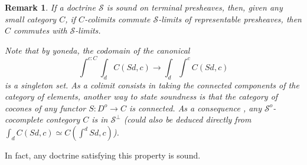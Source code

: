 \documentclass{article}
\newtheorem{question}[theorem]{Question}
\newtheorem{remark}[theorem]{Remark}
\begin{document}
\begin{remark}
 If a doctrine $\mathcal{S}$ is sound on terminal presheaves, %
 then, given any small category $C$, %
 if $C$-colimits commute $\mathcal{S}$-limits of representable presheaves, then $C$
 commutes with $\mathcal{S}$-limits.

  \label{r:sound-connected}
  Note that by yoneda, the codomain of the canonical 
  \[
    \int^{c: C} \int_d C(S d, c) \rightarrow
    \int_d \int^{c}  C(S d, c) 
  \]
  is a singleton set.
  As a colimit consists in taking the connected components of the category of elements,
  another way to state soundness is that the category of cocones of any functor
  $S : D^o \rightarrow C$ is connected.
  As a consequence \cite[Proposition 2.5]{lack_accessible}, any $\mathcal{S}^o$-cocomplete contegory $C$ is in
  $\mathcal{S}^\bot$ (could also be deduced directly from $\int_d C( S d, c)
  \simeq C(\int^d S d, c)$).
\end{remark}
In fact, any doctrine satisfying this property is sound.
\end{document}

